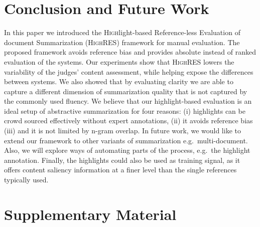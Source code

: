 \documentclass[11pt,a4paper]{article}
\newcommand\shashi[1]{{\textcolor{blue}{shashi: #1}}}
\newcommand\highres{\textsc{HighRES}}
\begin{document}
\section{Conclusion and Future Work}
In this paper we introduced the \textsc{High}light-based \textsc{R}eference-less \textsc{E}valuation of document \textsc{S}ummarization (\highres) framework for manual evaluation.
The proposed framework avoids reference  bias
and provides absolute instead of ranked evaluation of the systems. Our experiments show that \highres{}  lowers the variability of the judges' content assessment, while helping expose the differences between systems. We also showed that by evaluating clarity we are able to capture a different dimension of summarization quality that is not captured by the commonly used fluency. 
We believe that our highlight-based evaluation is an ideal setup of abstractive summarization for four reasons: (i) highlights can be crowd sourced effectively without expert annotations, (ii) it avoids reference bias (iii) and it is not limited by n-gram overlap.
In future work, we would like to extend our framework to other variants of summarization e.g.\  multi-document. Also, we will explore ways of automating parts of the process, e.g.\ the highlight annotation. Finally, the highlights could also be used as training signal, as it offers content saliency information at a finer level than the single references typically used.





\onecolumn
\newpage

\section*{Supplementary Material}
\end{document}
